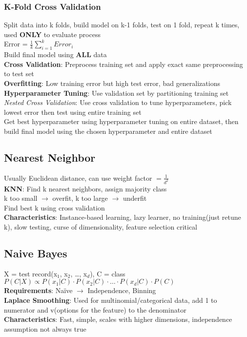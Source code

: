 \documentclass{article}
\begin{document}
\begin{multicols*}{2}
        \subsubsection*{K-Fold Cross Validation}
        Split data into k folds, build model on k-1 folds, test on 1 fold, repeat k times, used
        \textbf{ONLY} to evaluate process\\
        Error = $\frac{1}{k} \sum_{i=1}^{k} Error_i$\\
        Build final model using \textbf{ALL} data\\
        \textbf{Cross Validation}: Preprocess training set and apply exact same preprocessing to
        test set\\
        \textbf{Overfitting}: Low training error but high test error, bad generalizations\\
        \textbf{Hyperparameter Tuning}: Use validation set by partitioning training set\\
        \textit{Nested Cross Validation}: Use cross validation to tune hyperparameters, pick
        lowest error then test using entire training set\\
        Get best hyperparameter using hyperparameter tuning on entire dataset, then build final
        model using the chosen hyperparameter and entire dataset\\
        \subsection*{Nearest Neighbor}
        Usually Euclidean distance, can use weight factor $= \frac{1}{d^2}$\\
        \textbf{KNN}: Find k nearest neighbors, assign majority class\\
        k too small $\to$ overfit, k too large $\to$ underfit\\
        Find best k using cross validation\\
        \textbf{Characteristics}: Instance-based learning, lazy learner, no training(just retune
        k), slow testing, curse of dimensionality, feature selection critical\\
        \subsection*{Naive Bayes}
        X = test record(x$_1$, x$_2$, \ldots, x$_d$), C = class\\
        $P(C|X) \propto P(x_1|C) \cdot P(x_2|C) \cdot \ldots \cdot P(x_d|C) \cdot P(C)$\\
        \textbf{Requirements}: Na\"{i}ve $\to$ Independence, Binning\\
        \textbf{Laplace Smoothing}: Used for multinomial/categorical data, add 1 to numerator and
        v(options for the feature) to the denominator\\
        \textbf{Characteristics}: Fast, simple, scales with higher dimensions, independence
        assumption not always true\\

\end{multicols*}
\end{document}
